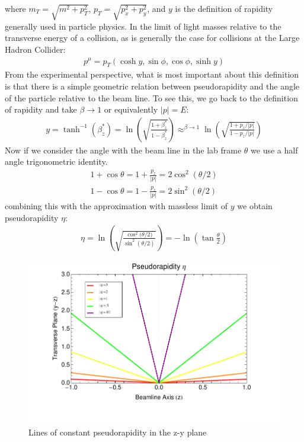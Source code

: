 where $m_T = \sqrt{m^2 + p_T^2}$, $p_T = \sqrt{ p_x^2 + p_y^2}$, and $y$ is the definition of rapidity generally used in particle
physics. In the limit of light masses relative to the  transverse energy of a collision, as is generally
 the case for collisions at the Large Hadron Collider:
\begin{align*}
p^\mu = p_T(\cosh y , \sin \phi, \cos \phi, \sinh y)
\end{align*}
From the experimental perspective, what is most important about this definition is that there is a simple geometric relation
between pseudorapidity and the angle of the particle relative to the beam line. To see this, we go back to the definition
of rapidity and take $\beta\rightarrow 1$ or equivalently $|p|=E$:
\begin{align*}
y = \tanh^{-1} ( \beta_z^* ) = \ln \left ( \sqrt{\frac{1+\beta_z^*}{1-\beta_z^*}  }\right ) \approx^{\beta\rightarrow 1} \ln \left ( \sqrt{\frac{1+p_z/|p|}{1-p_z/|p|}  }\right )
\end{align*}
Now if we consider the angle with the beam line in the lab frame $\theta$ we use a half angle trigonometric identity.
\begin{align*}
1+ \cos \theta = 1 +\frac{p_z}{|p|} = 2 \cos^2 (\theta / 2) \\ 
1- \cos \theta = 1 -\frac{p_z}{|p|} = 2 \sin^2 (\theta / 2)
\end{align*}
combining this with the approximation with massless limit of $y$ we obtain pseudorapidity $\eta$:
\begin{align*}
\eta = \ln \left ( \sqrt{\frac{\cos^2{(\theta/2})}{\sin^{2}{(\theta/2)} }}  \right) = - \ln \left ( \tan \frac{\theta}{2} \right )
\end{align*}
\begin{figure}
\begin{center}
\includegraphics[width=.6\textwidth]{figures/exp_proj/pseudorapidity}
\end{center}
\caption{Lines of constant pseudorapidity in the z-y plane}
\label{fig:pseudorapidity}
\end{figure}
